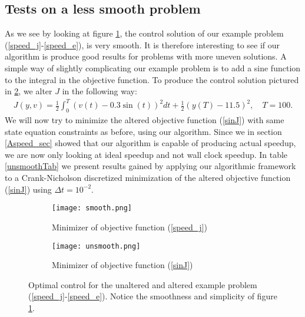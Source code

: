 \subsection{Tests on a less smooth problem}
As we see by looking at figure \ref{smootha}, the control solution of our example problem (\ref{speed_j}-\ref{speed_e}), is very smooth. It is therefore interesting to see if our algorithm is produce good results for problems with more uneven solutions. A simple way of slightly complicating our example problem is to add a sine function to the integral in the objective function. To produce the control solution pictured in \ref{smoothb}, we alter $J$ in the following way:
\begin{align}
J(y,v) = \frac{1}{2}\int_0^{T}(v(t)-0.3\sin(t))^2dt + \frac{1}{2}(y(T)-11.5)^2, \quad T=100. \label{sinJ}
\end{align}
We will now try to minimize the altered objective function (\ref{sinJ}) with same state equation constraints as before, using our algorithm. Since we in section \ref{Aspeed_sec} showed that our algorithm is capable of producing actual speedup, we are now only looking at ideal speedup and not wall clock speedup. In table \ref{unsmoothTab} we present results gained by applying our algorithmic framework to a Crank-Nicholson discretized minimization of the altered objective function (\ref{sinJ}) using $\Delta t = 10^{-2}$.
\begin{figure}[h]
\centering
\begin{subfigure}{.5\textwidth}
  \centering
  \texttt{[image: smooth.png]}
  \caption{Minimizer of objective function (\ref{speed_j})}
  \label{smootha}
\end{subfigure}%
\begin{subfigure}{.5\textwidth}
  \centering
  \texttt{[image: unsmooth.png]}
  \caption{Minimizer of objective function (\ref{sinJ})}
  \label{smoothb}
\end{subfigure}
\caption{Optimal control for the unaltered and altered example problem (\ref{speed_j}-\ref{speed_e}). Notice the smoothness and simplicity of figure \ref{smootha}.}
\label{smooth}
\end{figure}

